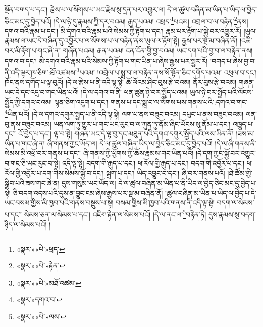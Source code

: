 སྔོན་བགད་པ་དང་། རྩེས་པ་ལ་སོགས་པ་ཡང་རྗེས་སུ་དྲན་པར་འགྱུར་ལ། དེ་ལ་ཚུལ་བཞིན་མ་ཡིན་པ་ཡིད་ལ་བྱེད་ཅིང་མང་དུ་བྱེད་པའོ། །དེ་ལ་ཉེ་དུ་རྣམས་ཀྱི་དར་བའམ། རྒུད་པའམ། འཕྲད་\footnote{«སྣར་»«པེ་»ཕྲད་}པའམ། འབྲལ་བ་ལ་བརྟེན་\footnote{«སྣར་»«པེ་»རྟེན་}ནས། དགའ་བའི་རྣམ་པ་དང་། མི་དགའ་བའི་རྣམ་པའི་སེམས་ཀྱི་རྟོག་པ་དང་། རྣམ་པར་རྟོག་པ་སྐྱེ་བར་འགྱུར་རོ། །ཡུལ་རྣམས་ལ་ཡང་དེ་བཞིན་དུ་འབྱོར་པ་ལ་སོགས་པ་ལ་བརྟེན་ནས་ཡུལ་ལ་རྟོག་སྟེ། རྒྱས་པར་སྔ་མ་བཞིན་ནོ། །འཆི་བར་མི་རྟོག་པ་གང་ཞེ་ན། གཞོན་པའམ། རྒན་པའམ། ངན་ངོན་གྱི་བྱ་བའམ། ཡང་དག་པའི་བྱ་བ་ལ་བརྟེན་ནས། དགའ་བ་དང་། མི་དགའ་བའི་རྣམ་པའི་སེམས་ཀྱི་རྟོག་པ་གང་ཡིན་པ་ཞེས་རྒྱས་པར་སྦྱར་རོ། །བགད་པ་ཞེས་བྱ་བ་ནི་འདི་ལྟར་ཁ་ཅིག་:ཐོ་འཚམས་\footnote{«སྣར་»«པེ་»མཐོ་འཚམ་}པའམ། །འབྲེལ་པ་སྨྲ་བ་ལ་བརྟེན་ནས་སོ་སྟོན་ཅིང་དགོད་པའམ། འཕུལ་བ་དང་། ཁོང་ནས་དགོད་པ་ལྟ་བུའོ། །དེ་ལ་རྩེས་པ་ནི་འདི་ལྟ་སྟེ། ཆོ་ལོའམ་ཤིང་བུས་རྩེ་བའམ། ནོར་བུས་རྩེ་བའམ། གཞན་ཡང་དེ་དང་འདྲ་བ་གང་ཡིན་པའོ། །དེ་ལ་དགའ་བ་ནི། ཕན་ཚུན་ཉེ་བར་སྤྱོད་པའམ། ཡུལ་ཉེ་བར་སྤྱོད་པའི་ལོངས་སྤྱོད་ཀྱི་དགའ་བའམ། ལྷན་ཅིག་འདུག་པ་དང་། གནས་པ་དང་སྨྲ་བ་ལ་སོགས་པས་གནས་པའི་:དགའ་བ་གང་\footnote{«སྣར་»དགའ་བ་}ཡིན་པའོ། །དེ་ལ་དགའ་དགུར་སྤྱད་པ་ནི་འདི་ལྟ་སྟེ། ལག་པ་ནས་བཟུང་བའམ། དཔུང་པ་ནས་བཟུང་བའམ། ལན་བུ་ནས་བཟུང་བའམ། ཡན་ལག་ཏུ་གྱུར་པ་གང་ཡང་རུང་བ་ལ་ཀུན་ཏུ་ནོམ་ཞིང་ཡོངས་སུ་ནོམ་པ་དང་། འཁྱུད་པ་དང་། འོ་བྱེད་པ་དང་། ལྟ་བ་སྟེ། གཞན་ཡང་དེ་ལྟ་བུ་དང་མཐུན་པའི་དགའ་དགུར་སྤྱོད་པའི་ལས་ཡིན་ནོ། །ཟས་མ་ཡིན་པ་གང་ཞེ་ན། ཞི་གནས་ཀྱང་ཡོད་ལ། དེ་ལ་ཚུལ་བཞིན་ཡིད་ལ་བྱེད་ཅིང་མང་དུ་བྱེད་པའོ། །དེ་ལ་ཞི་གནས་ནི་སེམས་མི་འཕྲོ་བར་གནས་པ་དང་། ཞི་གནས་ཀྱི་ཕྱོགས་ཀྱི་ཆོས་རྣམས་གང་ཡིན་པའོ། །དེ་དག་ཀྱང་སྐྱོ་བར་འགྱུར་བ་གང་ཅི་ཡང་རུང་བ་སྟེ། འདི་ལྟ་སྟེ། བདག་གི་རྒུད་པ་དང་། ཕ་རོལ་གྱི་རྒུད་པ་དང་། བདག་གི་འབྱོར་པ་དང་། ཕ་རོལ་གྱི་འབྱོར་པ་དག་གིས་སེམས་སྐྱོ་བ་དང་། སྐྲག་པ་དང་། ཡིད་འབྱུང་བ་དང་། ཞི་བར་གནས་པའོ། །ཐེ་ཚོམ་གྱི་སྒྲིབ་པའི་ཟས་གང་ཞེ་ན། དུས་གསུམ་ཡང་ཡོད་ལ། དེ་ལ་ཚུལ་བཞིན་མ་ཡིན་པ་ནི་ཡིད་ལ་བྱེད་ཅིང་མང་དུ་བྱེད་པ་སྟེ། ཅི་བདག་འདས་པའི་དུས་ན་བྱུང་ངམ་ཞེས་རྒྱས་པར་སྔ་མ་བཞིན་ནོ། །ཚུལ་བཞིན་མ་ཡིན་པ་ཡིད་ལ་བྱེད་པ་དེ་ཡང་བསམ་གྱིས་མི་ཁྱབ་པའི་གནས་བསྡུས་པ་སྟེ། བསམ་གྱིས་མི་ཁྱབ་པའི་གནས་ནི་འདི་ལྟ་སྟེ། བདག་ལ་སེམས་པ་དང་། སེམས་ཅན་ལ་སེམས་པ་དང་། འཇིག་རྟེན་ལ་སེམས་པའོ། །དེ་ལ་ནང་ལ་\footnote{«སྣར་»«པེ་»ལས་}བརྟེན་ཏེ། དུས་རྣམས་སུ་བདག་ཉིད་ལ་སེམས་པའོ། །
